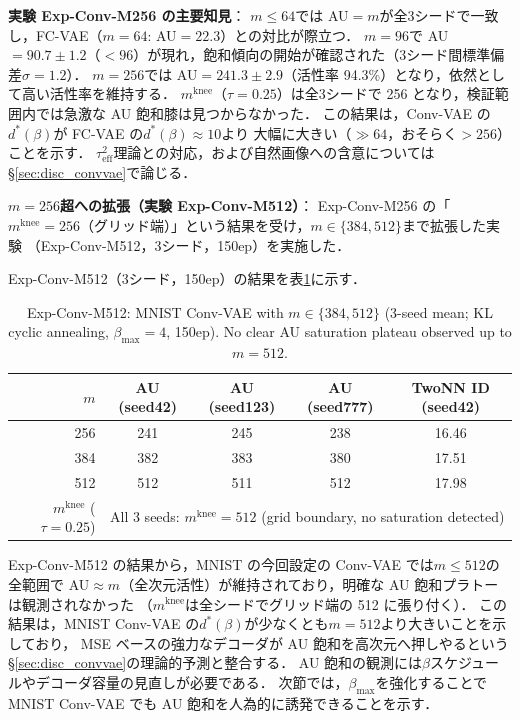 \documentclass[11pt,a4paper]{jsarticle}
\newcommand{\mknee}{m^{\mathrm{knee}}}
\begin{document}
\textbf{実験 Exp-Conv-M256 の主要知見}：
$m \leq 64$では AU$=m$が全3シードで一致し，FC-VAE（$m=64$: AU$=22.3$）との対比が際立つ．
$m = 96$で AU$=90.7\pm1.2$（$<96$）が現れ，飽和傾向の開始が確認された（3シード間標準偏差$\sigma=1.2$）．
$m=256$では AU$=241.3\pm2.9$（活性率 94.3\%）となり，依然として高い活性率を維持する．
$\mknee$（$\tau=0.25$）は全3シードで 256 となり，検証範囲内では急激な AU 飽和膝は見つからなかった．
この結果は，Conv-VAE の$d^*(\beta)$が FC-VAE の$d^*(\beta) \approx 10$より
大幅に大きい（$\gg 64$，おそらく$> 256$）ことを示す．
$\tau^2_\mathrm{eff}$理論との対応，および自然画像への含意については §\ref{sec:disc_convvae}で論じる．

\textbf{$m=256$超への拡張（実験 Exp-Conv-M512）}：
Exp-Conv-M256 の「$\mknee=256$（グリッド端）」という結果を受け，$m \in \{384, 512\}$まで拡張した実験
（Exp-Conv-M512，3シード，150ep）を実施した．

Exp-Conv-M512（3シード，150ep）の結果を表\ref{tab:en_ext}に示す．

\begin{table}[H]
\centering
\caption{Exp-Conv-M512: MNIST Conv-VAE with $m \in \{384, 512\}$ (3-seed mean; KL cyclic annealing, $\beta_\mathrm{max}=4$, 150ep). No clear AU saturation plateau observed up to $m=512$.}
\label{tab:en_ext}
\small
\begin{tabular}{r ccc c}
\toprule
$m$ & AU (seed42) & AU (seed123) & AU (seed777) & TwoNN ID (seed42) \\
\midrule
256 & 241 & 245 & 238 & 16.46 \\
384 & 382 & 383 & 380 & 17.51 \\
512 & 512 & 511 & 512 & 17.98 \\
\midrule
$\mknee$ ($\tau=0.25$) & \multicolumn{4}{c}{All 3 seeds: $\mknee=512$ (grid boundary, no saturation detected)} \\
\bottomrule
\end{tabular}
\end{table}

Exp-Conv-M512 の結果から，MNIST の今回設定の Conv-VAE では$m \leq 512$の全範囲で
AU$\approx m$（全次元活性）が維持されており，明確な AU 飽和プラトーは観測されなかった
（$\mknee$は全シードでグリッド端の 512 に張り付く）．
この結果は，MNIST Conv-VAE の$d^*(\beta)$が少なくとも$m=512$より大きいことを示しており，
MSE ベースの強力なデコーダが AU 飽和を高次元へ押しやるという
§\ref{sec:disc_convvae}の理論的予測と整合する．
AU 飽和の観測には$\beta$スケジュールやデコーダ容量の見直しが必要である．
次節では，$\beta_{\max}$を強化することで MNIST Conv-VAE でも AU 飽和を人為的に誘発できることを示す．
\end{document}
